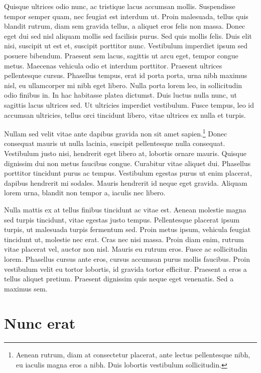 Quisque ultrices odio nunc, ac tristique lacus accumsan mollis. Suspendisse tempor semper quam, nec feugiat est interdum ut. Proin malesuada, tellus quis blandit rutrum, diam sem gravida tellus, a aliquet eros felis non massa. Donec eget dui sed nisl aliquam mollis sed facilisis purus. Sed quis mollis felis. Duis elit nisi, suscipit ut est et, suscipit porttitor nunc. Vestibulum imperdiet ipsum sed posuere bibendum. Praesent sem lacus, sagittis ut arcu eget, tempor congue metus. Maecenas vehicula odio et interdum porttitor. Praesent ultrices pellentesque cursus. Phasellus tempus, erat id porta porta, urna nibh maximus nisl, eu ullamcorper mi nibh eget libero. Nulla porta lorem leo, in sollicitudin odio finibus in. In hac habitasse platea dictumst. Duis luctus nulla nunc, ut sagittis lacus ultrices sed. Ut ultricies imperdiet vestibulum. Fusce tempus, leo id accumsan ultricies, tellus orci tincidunt libero, vitae ultrices ex nulla et turpis.

Nullam sed velit vitae ante dapibus gravida non sit amet sapien.\footnote{Aenean rutrum, diam at consectetur placerat, ante lectus pellentesque nibh, eu iaculis magna eros a nibh. Duis lobortis vestibulum sollicitudin.} Donec consequat mauris ut nulla lacinia, suscipit pellentesque nulla consequat. Vestibulum justo nisi, hendrerit eget libero at, lobortis ornare mauris. Quisque dignissim dui non metus faucibus congue. Curabitur vitae aliquet dui. Phasellus porttitor tincidunt purus ac tempus. Vestibulum egestas purus ut enim placerat, dapibus hendrerit mi sodales. Mauris hendrerit id neque eget gravida. Aliquam lorem urna, blandit non tempor a, iaculis nec libero.

Nulla mattis ex at tellus finibus tincidunt ac vitae est. Aenean molestie magna sed turpis tincidunt, vitae egestas justo tempus. Pellentesque placerat ipsum turpis, ut malesuada turpis fermentum sed. Proin metus ipsum, vehicula feugiat tincidunt ut, molestie nec erat. Cras nec nisi massa. Proin diam enim, rutrum vitae placerat vel, auctor non nisl. Mauris eu rutrum eros. Fusce ac sollicitudin lorem. Phasellus cursus ante eros, cursus accumsan purus mollis faucibus. Proin vestibulum velit eu tortor lobortis, id gravida tortor efficitur. Praesent a eros a tellus aliquet pretium. Praesent dignissim quis neque eget venenatis. Sed a maximus sem.

\section{Nunc erat}

